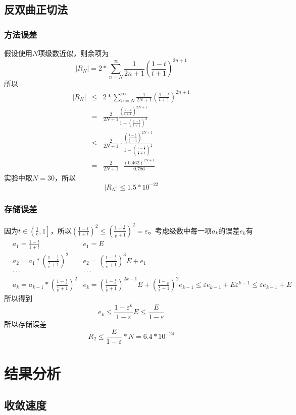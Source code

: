 \documentclass[UTF8,twocolum,titlepage]{ctexart}
\begin{document}
\subsection*{反双曲正切法}
\subsubsection*{方法误差}
假设使用$N$项级数近似，则余项为$$\left|R_N\right| =  2*\sum_{n=N}^{\infty}\frac{1}{2n+1}\left(\frac{1-t}{t+1}\right)^{2n+1}$$所以
\begin{eqnarray*}
\left|R_N\right| &\le& 2*\sum_{n=N}^{\infty}\frac{1}{2N+1}\left(\frac{1-t}{t+1}\right)^{2n+1} \\ &=& \frac{2}{2N+1}\frac{\left(\frac{1-t}{t+1}\right)^{2N+1}}{1-\left(\frac{1-t}{t+1}\right)^2}\\&\le& \frac{2}{2N+1}\cdot\frac{\left(\frac{1-\frac{1}{e}}{\frac{1}{e}+1}\right)^{2N+1}}{1-\left(\frac{1-\frac{1}{e}}{\frac{1}{e}+1}\right)^2}\\&=&\frac{2}{2N+1}\cdot\frac{\left(0.462\right)^{2N+1}}{0.786}
\end{eqnarray*}
实验中取$N=30$，所以$$\left|R_N\right| \le 1.5*10^{-22}$$
\subsubsection*{存储误差}
因为$t\in\left(\frac{1}{e},1\right]$，所以$\left(\frac{1-t}{1+t}\right)^2 \le \left(\frac{1-\frac{1}{e}}{\frac{1}{e}+1}\right)^2=\varepsilon$。考虑级数中每一项$a_k$的误差$e_k$有
\begin{eqnarray*}
&a_1=\frac{1-t}{1+t} &e_1=E\\
&a_2=a_1*\left(\frac{1-\frac{1}{e}}{\frac{1}{e}+1}\right)^2 &e_2=\left(\frac{1-\frac{1}{e}}{\frac{1}{e}+1}\right)^3E+e_1\\
&\cdot\cdot\cdot&\cdot\cdot\cdot\\
&a_k=a_{k-1}*\left(\frac{1-\frac{1}{e}}{\frac{1}{e}+1}\right)^2 &e_k=\left(\frac{1-\frac{1}{e}}{\frac{1}{e}+1}\right)^{2k-1}E+\left(\frac{1-\frac{1}{e}}{\frac{1}{e}+1}\right)^2e_{k-1} \le \varepsilon e_{k-1}+E\varepsilon^{k-1} \le \varepsilon e_{k-1}+E
\end{eqnarray*}
所以得到$$e_k \le \frac{1-\varepsilon^k}{1-\varepsilon}E \le \frac{E}{1-\varepsilon}$$所以存储误差$$R_2 \le \frac{E}{1-\varepsilon}*N=6.4*10^{-24}$$
\section*{结果分析}
\subsection*{收敛速度}
\end{document}

